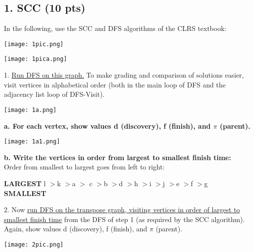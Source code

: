 \documentclass[12pt]{article}
\begin{document}
\subsection*{1. SCC (10 pts)} 
\linebreak
In the following, use the SCC and DFS algorithms of the CLRS textbook: \\
\begin{center}
\texttt{[image: 1pic.png]} \\
\end{center}
\begin{center}
\texttt{[image: 1pica.png]} \\
\end{center}
1. \underline{Run DFS on this graph.} To make grading and comparison of solutions easier, visit vertices in alphabetical order (both in the main loop of DFS and the adjacency list loop of DFS-Visit). \\
\begin{center}
\texttt{[image: 1a.png]}\\
\end{center}
\textbf{a. For each vertex, show values d (discovery), f (finish), and $\pi$ (parent).} \\
\linebreak
\begin{center}
\texttt{[image: 1a1.png]} \\
\end{center}
\linebreak
\textbf{b. Write the vertices in order from largest to smallest finish time:} \\
\linebreak
Order from smallest to largest goes from left to right: \\
\begin{center}
\textbf{LARGEST} l $>$k $>$a $>$ c $>$b $>$d $>$h $>$i $>$j $>$e $>$f $>$g \textbf{SMALLEST} \\
\end{center}
2. Now \underline{run DFS on the transpose graph, visiting vertices in order of largest to smallest finish time} from the DFS of step 1 (as required by the SCC algorithm). Again, show values d (discovery), f (finish), and $\pi$ (parent). \\
\begin{center}
\texttt{[image: 2pic.png]} \\
\end{center}
\end{document}
